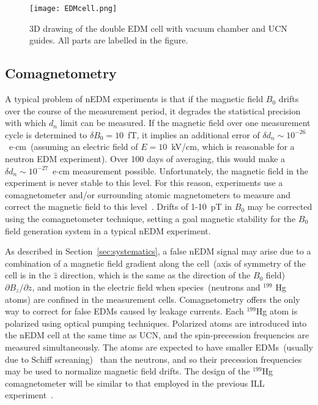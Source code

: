 \begin{figure}[h!]
  \centering
  \texttt{[image: EDMcell.png]}
  \caption[3D drawing of TUCAN's double EDM cell]{3D drawing of the
    double EDM cell with vacuum chamber and UCN guides. All parts are
    labelled in the figure.}
  \label{fig:HVcell}
\end{figure}



\subsection{Comagnetometry~\label{sec:comag}}
A typical problem of nEDM experiments is that if the magnetic field
$B_0$ drifts over the course of the measurement period, it degrades
the statistical precision with which $d_n$ limit can be measured. If
the magnetic field over one measurement cycle is determined to
$\delta B_0=10$~fT, it implies an additional error of
$\delta d_n\sim 10^{-26}$~e$\cdot$cm~(assuming an electric field of
$E=10$~kV/cm, which is reasonable for a neutron EDM experiment). Over
100 days of averaging, this would make a
$\delta d_n\sim 10^{-27}$~e$\cdot$cm measurement possible.
Unfortunately, the magnetic field in the experiment is never stable to
this level.  For this reason, experiments use a comagnetometer and/or
surrounding atomic magnetometers to measure and correct the magnetic
field to this
level~\cite{Baker2006,brys2005magnetic,afach2014dynamic}. Drifts of
1-10~pT in $B_0$ may be corrected using the comagnetometer technique,
setting a goal magnetic stability for the $B_0$ field generation
system in a typical nEDM experiment.



As described in Section~\ref{sec:systematics}, a false nEDM signal may
arise due to a combination of a magnetic field gradient along the
cell~(axis of symmetry of the cell is in the $\hat{z}$ direction,
which is the same as the direction of the $B_0$ field)
$\partial {B_z}/\partial z$, and motion in the electric field when
species~(neutrons and $^{199}$ Hg atoms) are confined in the
measurement cells. Comagnetometry offers the only way to correct for
false EDMs caused by leakage currents.  Each $^{199}$Hg atom is
polarized using optical pumping techniques. Polarized atoms are
introduced into the nEDM cell at the same time as UCN, and the
spin-precession frequencies are measured simultaneously. The atoms are
expected to have smaller EDMs~(usually due to Schiff
screaning)~\cite{pospelov2005electric} than the neutrons, and so their
precession frequencies may be used to normalize magnetic field drifts.
The design of the $^{199}$Hg comagnetometer will be similar to that
employed in the previous ILL experiment~\cite{Baker2006,Griffith2009}.

